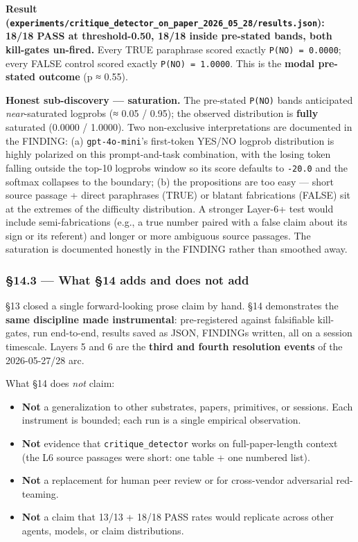\documentclass[
]{article}
\providecommand{\tightlist}{%
  \setlength{\itemsep}{0pt}\setlength{\parskip}{0pt}}
\begin{document}
\textbf{Result
(\texttt{experiments/critique\_detector\_on\_paper\_2026\_05\_28/results.json}):}
\textbf{18/18 PASS at threshold-0.50, 18/18 inside pre-stated bands,
both kill-gates un-fired.} Every TRUE paraphrase scored exactly
\texttt{P(NO)\ =\ 0.0000}; every FALSE control scored exactly
\texttt{P(NO)\ =\ 1.0000}. This is the \textbf{modal pre-stated outcome}
(p ≈ 0.55).

\textbf{Honest sub-discovery --- saturation.} The pre-stated
\texttt{P(NO)} bands anticipated \emph{near}-saturated logprobs (≈ 0.05
/ 0.95); the observed distribution is \textbf{fully} saturated (0.0000 /
1.0000). Two non-exclusive interpretations are documented in the
FINDING: (a) \texttt{gpt-4o-mini}'s first-token YES/NO logprob
distribution is highly polarized on this prompt-and-task combination,
with the losing token falling outside the top-10 logprobs window so its
score defaults to \texttt{-20.0} and the softmax collapses to the
boundary; (b) the propositions are too easy --- short source passage +
direct paraphrases (TRUE) or blatant fabrications (FALSE) sit at the
extremes of the difficulty distribution. A stronger Layer-6+ test would
include semi-fabrications (e.g., a true number paired with a false claim
about its sign or its referent) and longer or more ambiguous source
passages. The saturation is documented honestly in the FINDING rather
than smoothed away.

\subsubsection{§14.3 --- What §14 adds and does not
add}\label{what-14-adds-and-does-not-add}

§13 closed a single forward-looking prose claim by hand. §14
demonstrates the \textbf{same discipline made instrumental}:
pre-registered against falsifiable kill-gates, run end-to-end, results
saved as JSON, FINDINGs written, all on a session timescale. Layers 5
and 6 are the \textbf{third and fourth resolution events} of the
2026-05-27/28 arc.

What §14 does \emph{not} claim:

\begin{itemize}
\tightlist
\item
  \textbf{Not} a generalization to other substrates, papers, primitives,
  or sessions. Each instrument is bounded; each run is a single
  empirical observation.
\item
  \textbf{Not} evidence that \texttt{critique\_detector} works on
  full-paper-length context (the L6 source passages were short: one
  table + one numbered list).
\item
  \textbf{Not} a replacement for human peer review or for cross-vendor
  adversarial red-teaming.
\item
  \textbf{Not} a claim that 13/13 + 18/18 PASS rates would replicate
  across other agents, models, or claim distributions.
\end{itemize}
\end{document}
